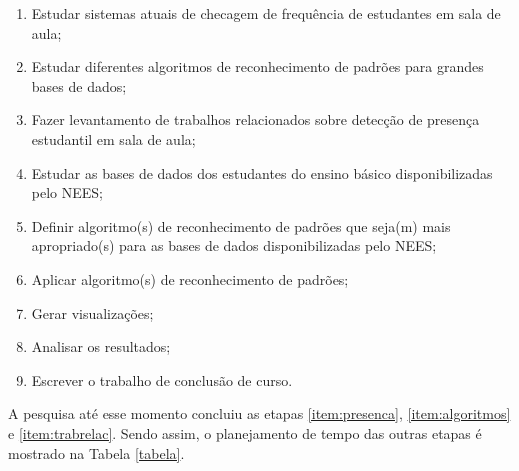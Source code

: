 \begin{enumerate}
	\item \label{item:presenca} Estudar sistemas atuais de checagem de frequência de estudantes em sala de aula;
    \item \label{item:algoritmos} Estudar diferentes algoritmos de reconhecimento de padrões para grandes bases de dados;
    \item \label{item:trabrelac} Fazer levantamento de trabalhos relacionados sobre detecção de presença estudantil em sala de aula;
    \item \label{item:base} Estudar as bases de dados dos estudantes do ensino básico disponibilizadas pelo NEES;
    \item \label{item:definir} Definir algoritmo(s) de reconhecimento de padrões que seja(m) mais apropriado(s) para as bases de dados disponibilizadas pelo NEES;
    \item \label{item:algoritmo} Aplicar algoritmo(s) de reconhecimento de padrões;
    \item \label{item:graficos} Gerar visualizações;
    \item \label{item:analise} Analisar os resultados;
	\item \label{item:escrita} Escrever o trabalho de conclusão de curso.
	\end{enumerate}

  A pesquisa até esse momento concluiu as etapas \ref{item:presenca}, \ref{item:algoritmos} e \ref{item:trabrelac}. Sendo assim, o planejamento de tempo das outras etapas é mostrado na Tabela \ref{tabela}.

